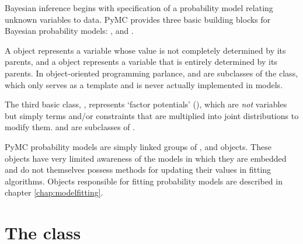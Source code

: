 
Bayesian inference begins with specification of a probability model relating unknown variables to data. PyMC provides three basic building blocks for Bayesian probability models: ,  and . 

A  object represents a variable whose value is not completely determined by its parents, and a  object represents a variable that is entirely determined by its parents. In object-oriented programming parlance,  and  are subclasses of the  class, which only serves as a template and is never actually implemented in models. 

The third basic class, , represents `factor potentials' (\cite{dawidmarkov,Jordan:2004p5439}), which are \emph{not} variables but simply terms and/or constraints that are multiplied into joint distributions to modify them.  and  are subclasses of .



\medskip
PyMC probability models are simply linked groups of ,  and  objects. These objects have very limited awareness of the models in which they are embedded and do not themselves possess methods for updating their values in fitting algorithms. Objects responsible for fitting probability models are described in chapter \ref{chap:modelfitting}.
 

\hypertarget{stochastic}{}
\section*[The Stochastic class]{The  class} \label{stochastic}

